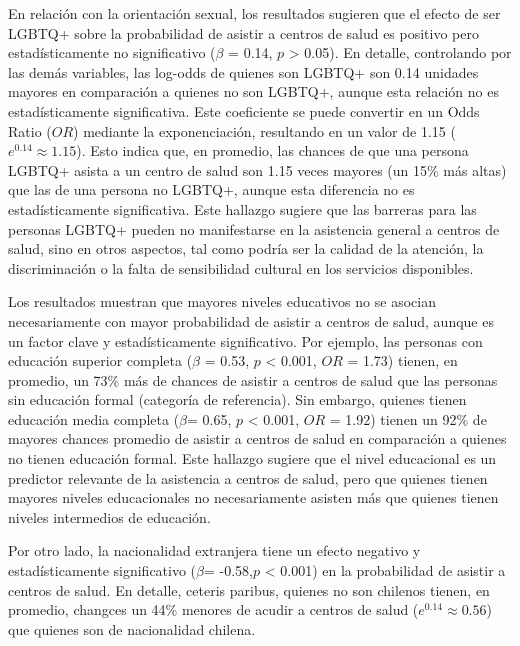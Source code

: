 \documentclass[
  12pt,
  a4paper,
]{article}
\begin{document}
En relación con la orientación sexual, los resultados sugieren que el efecto de ser LGBTQ+ sobre la probabilidad de asistir a centros de salud es positivo pero estadísticamente no significativo (\(\beta\) = 0.14, \(p\) \textgreater{} 0.05). En detalle, controlando por las demás variables, las log-odds de quienes son LGBTQ+ son 0.14 unidades mayores en comparación a quienes no son LGBTQ+, aunque esta relación no es estadísticamente significativa. Este coeficiente se puede convertir en un Odds Ratio (\(OR\)) mediante la exponenciación, resultando en un valor de 1.15 (\(e^{0.14} \approx 1.15\)). Esto indica que, en promedio, las chances de que una persona LGBTQ+ asista a un centro de salud son 1.15 veces mayores (un 15\% más altas) que las de una persona no LGBTQ+, aunque esta diferencia no es estadísticamente significativa. Este hallazgo sugiere que las barreras para las personas LGBTQ+ pueden no manifestarse en la asistencia general a centros de salud, sino en otros aspectos, tal como podría ser la calidad de la atención, la discriminación o la falta de sensibilidad cultural en los servicios disponibles.

Los resultados muestran que mayores niveles educativos no se asocian necesariamente con mayor probabilidad de asistir a centros de salud, aunque es un factor clave y estadísticamente significativo. Por ejemplo, las personas con educación superior completa (\(\beta\) = 0.53, \(p\) \textless{} 0.001, \(OR\) = 1.73) tienen, en promedio, un 73\% más de chances de asistir a centros de salud que las personas sin educación formal (categoría de referencia). Sin embargo, quienes tienen educación media completa (\(\beta\)= 0.65, \(p\) \textless{} 0.001, \(OR\) = 1.92) tienen un 92\% de mayores chances promedio de asistir a centros de salud en comparación a quienes no tienen educación formal. Este hallazgo sugiere que el nivel educacional es un predictor relevante de la asistencia a centros de salud, pero que quienes tienen mayores niveles educacionales no necesariamente asisten más que quienes tienen niveles intermedios de educación.

Por otro lado, la nacionalidad extranjera tiene un efecto negativo y estadísticamente significativo (\(\beta\)= -0.58,\(p\) \textless{} 0.001) en la probabilidad de asistir a centros de salud. En detalle, ceteris paribus, quienes no son chilenos tienen, en promedio, changces un 44\% menores de acudir a centros de salud (\(e^{0.14} \approx 0.56\)) que quienes son de nacionalidad chilena.
\end{document}
